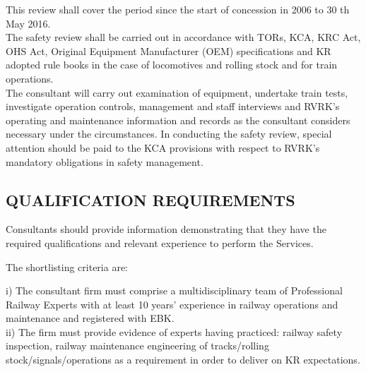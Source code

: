  This review shall cover the period since the start of concession in 2006
 to 30 th May 2016.\\The safety review shall be carried out in accordance
 with TORs, KCA, KRC Act, OHS Act, Original Equipment Manufacturer (OEM)
 specifications and KR adopted rule books in the case of locomotives and
 rolling stock and for train operations.\\The consultant will carry out
 examination of equipment, undertake train tests, investigate operation
 controls, management and staff interviews and RVRK's operating and
 maintenance information and records as the consultant considers
 necessary under the circumstances. In conducting the safety review,
 special attention should be paid to the KCA provisions with respect to
 RVRK's mandatory obligations in safety management.
 
 \subsection{QUALIFICATION REQUIREMENTS}\label{qualification-requirements}
 
 Consultants should provide information demonstrating that they have the
 required qualifications and relevant experience to perform the Services.
 
 The shortlisting criteria are:
 
 i) The consultant firm must comprise a
 multidisciplinary team of Professional Railway Experts with at least 10
 years' experience in railway operations and maintenance and registered
 with EBK.\\
 ii) The firm must provide evidence of experts having  practiced: railway safety inspection, railway maintenance engineering of
 tracks/rolling stock/signals/operations as a requirement in order to  deliver on KR expectations.\\
 
